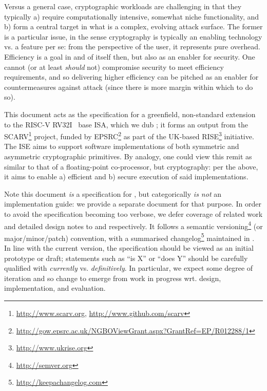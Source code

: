 
Versus a general case, cryptographic workloads are challenging in that they
typically
a) require computationally intensive, somewhat niche functionality,
   and
b) form a central target in what is a complex, evolving attack surface.
The former is a particular issue, in the sense cryptography is typically an
enabling technology vs. a feature per se: from the perspective of the user,
it represents pure overhead.  Efficiency is a goal in and of itself then, 
but also as an enabler for security.  One cannot (or at least {\em should} 
not) compromise security to meet efficiency requirements, and so delivering
higher efficiency can be pitched as an enabler for countermeasures against 
attack (since there is more margin within which to do so).

This document acts as the specification for a 
greenfield, non-standard extension~\cite[Section 21.1]{SCARV:RV:ISA:I:17} 
to the RISC-V 
RV32I~\cite[Section 2]{SCARV:RV:ISA:I:17}
base ISA, which we dub \XCID; it forms an output from the SCARV\footnote{
\url{http://www.scarv.org}, \url{http://www.github.com/scarv}
} project, funded by EPSRC\footnote{
\url{http://gow.epsrc.ac.uk/NGBOViewGrant.aspx?GrantRef=EP/R012288/1}
} as part of the UK-based RISE\footnote{
\url{http://www.ukrise.org}
} initiative.
The \XCID ISE aims to support software implementations of both symmetric and 
asymmetric cryptographic primitives.  By analogy, one could view this remit
as similar to that of a floating-point co-processor, but cryptography: 
per the above, it aims to enable
a) efficient
   and
b) secure
execution of said implementations.

Note this document {\em is} a specification for \XCID, but categorically
{\em is not} an implementation guide: we provide a separate document for 
that purpose.  In order to avoid the specification becoming too verbose,
we defer coverage of related work and detailed design notes to
and
respectively.  It follows a semantic versioning\footnote{
\url{http://semver.org}
} (or major/minor/patch) convention, with a summarised changelog\footnote{
\url{http://keepachangelog.com}
} maintained in
.
In line with the current version, the specification should be viewed as an
initial prototype or draft; statements such as 
``\XCID is   X'' 
or
``\XCID does Y''
should be carefully qualified with {\em currently} vs. {\em definitively}.  
In particular, we expect some degree of iteration and so change to emerge 
from work in progress wrt. design, implementation, and evaluation.


